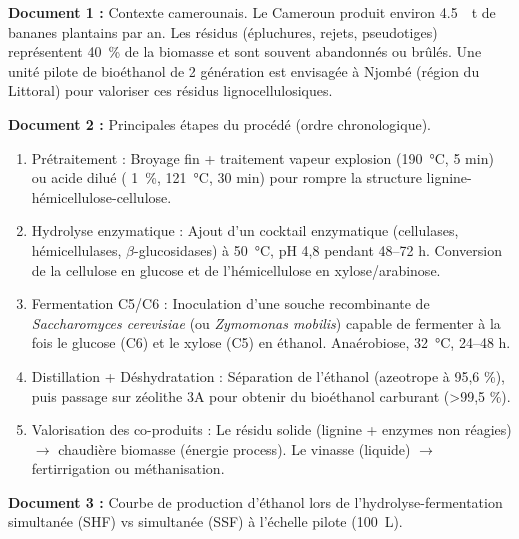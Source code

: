 \documentclass[11pt]{article}
\begin{document}
\begin{exercice}
\textbf{Document 1 :} Contexte camerounais. Le Cameroun produit environ \SI{4,5}{\million\tonne} de bananes plantains par an. Les résidus (épluchures, rejets, pseudotiges) représentent \SI{40}{\%} de la biomasse et sont souvent abandonnés ou brûlés. Une unité pilote de bioéthanol de 2 génération est envisagée à Njombé (région du Littoral) pour valoriser ces résidus lignocellulosiques.

\textbf{Document 2 :} Principales étapes du procédé (ordre chronologique).
\begin{enumerate}
    \item Prétraitement : Broyage fin + traitement vapeur explosion (\SI{190}{\celsius}, 5 min) ou acide dilué ( \SI{1}{\%}, \SI{121}{\celsius}, 30 min) pour rompre la structure lignine-hémicellulose-cellulose.
    \item Hydrolyse enzymatique : Ajout d'un cocktail enzymatique (cellulases, hémicellulases, $\beta$-glucosidases) à \SI{50}{\celsius}, pH 4,8 pendant 48--72 h. Conversion de la cellulose en glucose et de l'hémicellulose en xylose/arabinose.
    \item Fermentation C5/C6 : Inoculation d'une souche recombinante de \emph{Saccharomyces cerevisiae} (ou \emph{Zymomonas mobilis}) capable de fermenter à la fois le glucose (C6) et le xylose (C5) en éthanol. Anaérobiose, \SI{32}{\celsius}, 24--48 h.
    \item Distillation + Déshydratation : Séparation de l'éthanol (azeotrope à 95,6 \%), puis passage sur zéolithe 3A pour obtenir du bioéthanol carburant (\textgreater 99,5 \%).
    \item Valorisation des co-produits : Le résidu solide (lignine + enzymes non réagies) $\to$ chaudière biomasse (énergie process). Le vinasse (liquide) $\to$ fertirrigation ou méthanisation.
\end{enumerate}

\textbf{Document 3 :} Courbe de production d'éthanol lors de l'hydrolyse-fermentation simultanée (SHF) vs simultanée (SSF) à l'échelle pilote (\SI{100}{\liter}).
\begin{center}
\end{center}


\end{exercice}
\end{document}
